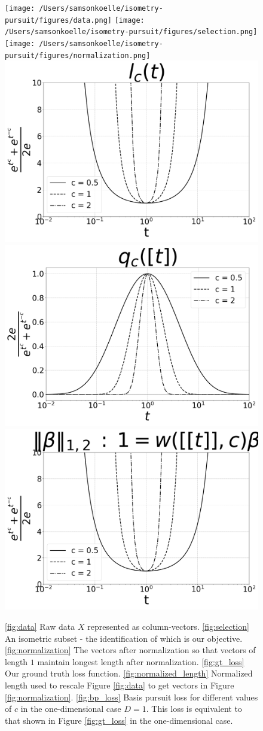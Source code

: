 
\begin{figure}[t]
\centering
{\texttt{[image: /Users/samsonkoelle/isometry-pursuit/figures/data.png]}}
{\texttt{[image: /Users/samsonkoelle/isometry-pursuit/figures/selection.png]}}
{\texttt{[image: /Users/samsonkoelle/isometry-pursuit/figures/normalization.png]}}
{\includegraphics[width = .32\textwidth]{../figures/Figure_1a_bw.png}}
{\includegraphics[width = .32\textwidth]{../figures/Figure_1b_bw.png}}
{\includegraphics[width = .32\textwidth]{../figures/Figure_1c_bw.png}}

\caption{\ref{fig:data} Raw data $X$ represented as column-vectors.
 \ref{fig:selection} An isometric subset - the identification of which is our objective.
 \ref{fig:normalization} The vectors after normalization so that vectors of length $1$ maintain longest length after normalization.
 \ref{fig:gt_loss} Our ground truth loss function.
 \ref{fig:normalized_length} Normalized length used to rescale Figure \ref{fig:data} to get vectors in Figure \ref{fig:normalization}.
 \ref{fig:bp_loss} Basis pursuit loss for different values of $c$ in the one-dimensional case $D = 1$. 
This loss is equivalent to that shown in Figure \ref{fig:gt_loss} in the one-dimensional case.
\label{fig:losses}
}
\end{figure}

